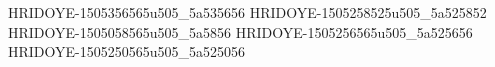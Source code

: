HRIDOYE-1505356565u505_5a535656
HRIDOYE-1505258525u505_5a525852
HRIDOYE-1505058565u505_5a5856
HRIDOYE-1505256565u505_5a525656
HRIDOYE-1505250565u505_5a525056
